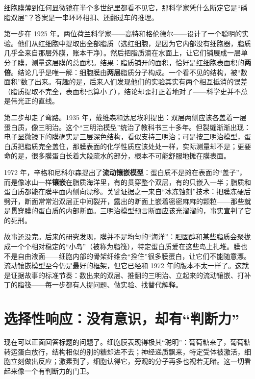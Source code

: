 \begin{zhengju}
细胞膜薄到任何显微镜在半个多世纪里都看不见它，那科学家凭什么断定它是“磷脂双层”？答案是一串环环相扣、还翻过车的推理。

第一步在 1925 年。两位荷兰科学家——高特和格伦德尔——设计了一个聪明的实验。他们从红细胞中提取出全部脂质（选红细胞，是因为它内部没有细胞器，脂质几乎全来自那层外膜，账本干净）。然后把脂质滴在水面上，让它们铺展成一层单分子膜，测量这层膜的总面积。结果：脂质铺开的面积，恰好是红细胞表面积的\textbf{两倍}。结论几乎是唯一解：细胞膜由\textbf{两层}脂质分子构成。一个看不见的结构，被“数面积”数了出来。有趣的是，后来人们发现他们的实验其实有两个相互抵消的误差（脂质提取不完全，表面积也算小了），结论却歪打正着地对了——科学史并不总是伟光正的直线。

第二步却走了弯路。1935 年，戴维森和达尼埃利提出：双层两侧应该各盖着一层蛋白质，像三明治。这个“三明治模型”统治了教科书三十多年。但裂缝渐渐出现：电子显微镜下的膜确实是三层深色结构，看似支持三明治；可是按三明治模型，蛋白质把脂质完全盖住，那膜表面的化学性质应该处处一样，实际测量却不是；更要命的是，很多膜蛋白长着大段疏水的部分，根本不可能舒服地摊在膜表面。

1972 年，辛格和尼科尔森提出了\textbf{流动镶嵌模型}：蛋白质不是摊在表面的“盖子”，而是像冰山一样\textbf{镶嵌}在脂质海洋里，有的贯穿整个双层，有的只嵌入一半；脂质和蛋白质都能在膜平面内侧向漂移。关键证据之一来自“冰冻蚀刻”技术：把膜冻硬后劈开，断面常常沿双层正中间裂开，露出的断面上嵌着密密麻麻的颗粒——那些就是贯穿膜的蛋白质的内部断面。三明治模型预言断面应该光溜溜的，事实宣判了它的死刑。

故事还没完。后来的研究发现，膜并不是均匀的“海洋”：胆固醇和某些脂质会聚拢成一个个相对稳定的“小岛”（被称为脂筏），特定蛋白质爱在这些岛上扎堆。膜也不是自由液面——细胞内部的骨架纤维会“拴住”很多膜蛋白，让它们不能随意漂。流动镶嵌模型至今仍是最好的框架，但它已经和 1972 年的版本不太一样了。这就是证据故事的标准节奏：数出来的双层、推翻的三明治、立起来的流动镶嵌、打补丁的脂筏——每一步都有人提问题、做实验、找替代解释。
\end{zhengju}

\section{选择性响应：没有意识，却有“判断力”}

现在可以正面回答标题的问题了。细胞膜表现得极其“聪明”：葡萄糖来了，葡萄糖转运蛋白放行，结构相似的别的糖却进不去；神经递质飘来，特定受体被激活，细胞立刻做出反应；激素到了，细胞认得它，旁观的分子再多也视若无睹。这一切看起来像一个有判断力的门卫。

